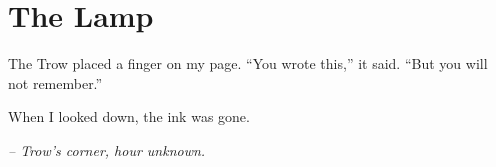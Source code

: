 \chapter*{The Lamp}

The Trow placed a finger on my page. “You wrote this,” it said. “But you will not remember.”

When I looked down, the ink was gone.

\smallskip

\noindent \textit{– Trow’s corner, hour unknown.}

